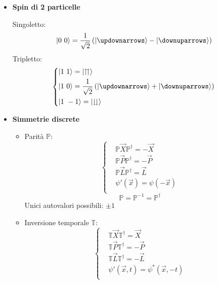 \documentclass{article}
\DeclarePairedDelimiter\ket{\lvert}{\rangle}
\begin{document}
\begin{small}
\begin{multicols*}{3}
\begin{itemize}[leftmargin=*]
	\item \textbf{Spin di 2 particelle}
		
		Singoletto:
		\[\ket*{0\ 0} = \frac{1}{\sqrt{2}} \left(\ket*{\updownarrows } - \ket*{\downuparrows }\right) \]
		Tripletto:
		\[
			\left\{\begin{aligned}
				&\ket*{1\ 1} = \ket*{\upuparrows }\\
				&\ket*{1\ 0} = \frac{1}{\sqrt{2}}\left(\ket*{\updownarrows } + \ket*{\downuparrows }\right)\\
				&\ket*{1\ -1} = \ket*{\downdownarrows }\\
			\end{aligned}\right.
		\]

	\item \textbf{Simmetrie discrete}
		\begin{itemize}
			\item Parità $\mathbb{P}$:
				\[
					\left\{\begin{aligned}
						&\mathbb{P}\vec{X}\mathbb{P}^\dag=-\vec{X}\\
						&\mathbb{P}\vec{P}\mathbb{P}^\dag=-\vec{P}\\
						&\mathbb{P}\vec{L}\mathbb{P}^\dag=\vec{L}\\
						&\psi '(\vec{x})= \psi (-\vec{x})\\
					\end{aligned}\right.
				\]
				\[\mathbb{P}=\mathbb{P}^{-1} = \mathbb{P}^\dag\]
				Unici autovalori possibili: $\pm1$
			\item Inversione temporale $\mathbb{T}$:
				\[
					\left\{\begin{aligned}
						&\mathbb{T}\vec{X}\mathbb{T}^\dag=\vec{X}\\
						&\mathbb{T}\vec{P}\mathbb{T}^\dag=-\vec{P}\\
						&\mathbb{T}\vec{L}\mathbb{T}^\dag=-\vec{L}\\
						&\psi '(\vec{x},t)= \psi^* (\vec{x},-t)\\
					\end{aligned}\right.
				\]


\end{itemize}
\end{itemize}
\end{multicols*}
\end{small}
\end{document}
